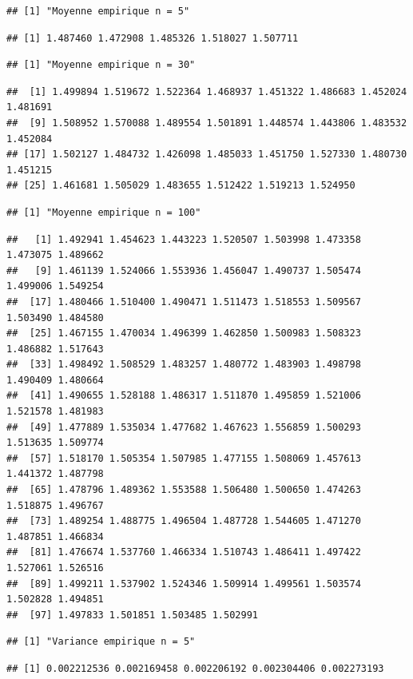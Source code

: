 \documentclass[
]{article}
\begin{document}
\begin{verbatim}
## [1] "Moyenne empirique n = 5"
\end{verbatim}

\begin{verbatim}
## [1] 1.487460 1.472908 1.485326 1.518027 1.507711
\end{verbatim}

\begin{verbatim}
## [1] "Moyenne empirique n = 30"
\end{verbatim}

\begin{verbatim}
##  [1] 1.499894 1.519672 1.522364 1.468937 1.451322 1.486683 1.452024 1.481691
##  [9] 1.508952 1.570088 1.489554 1.501891 1.448574 1.443806 1.483532 1.452084
## [17] 1.502127 1.484732 1.426098 1.485033 1.451750 1.527330 1.480730 1.451215
## [25] 1.461681 1.505029 1.483655 1.512422 1.519213 1.524950
\end{verbatim}

\begin{verbatim}
## [1] "Moyenne empirique n = 100"
\end{verbatim}

\begin{verbatim}
##   [1] 1.492941 1.454623 1.443223 1.520507 1.503998 1.473358 1.473075 1.489662
##   [9] 1.461139 1.524066 1.553936 1.456047 1.490737 1.505474 1.499006 1.549254
##  [17] 1.480466 1.510400 1.490471 1.511473 1.518553 1.509567 1.503490 1.484580
##  [25] 1.467155 1.470034 1.496399 1.462850 1.500983 1.508323 1.486882 1.517643
##  [33] 1.498492 1.508529 1.483257 1.480772 1.483903 1.498798 1.490409 1.480664
##  [41] 1.490655 1.528188 1.486317 1.511870 1.495859 1.521006 1.521578 1.481983
##  [49] 1.477889 1.535034 1.477682 1.467623 1.556859 1.500293 1.513635 1.509774
##  [57] 1.518170 1.505354 1.507985 1.477155 1.508069 1.457613 1.441372 1.487798
##  [65] 1.478796 1.489362 1.553588 1.506480 1.500650 1.474263 1.518875 1.496767
##  [73] 1.489254 1.488775 1.496504 1.487728 1.544605 1.471270 1.487851 1.466834
##  [81] 1.476674 1.537760 1.466334 1.510743 1.486411 1.497422 1.527061 1.526516
##  [89] 1.499211 1.537902 1.524346 1.509914 1.499561 1.503574 1.502828 1.494851
##  [97] 1.497833 1.501851 1.503485 1.502991
\end{verbatim}

\begin{verbatim}
## [1] "Variance empirique n = 5"
\end{verbatim}

\begin{verbatim}
## [1] 0.002212536 0.002169458 0.002206192 0.002304406 0.002273193
\end{verbatim}
\end{document}
